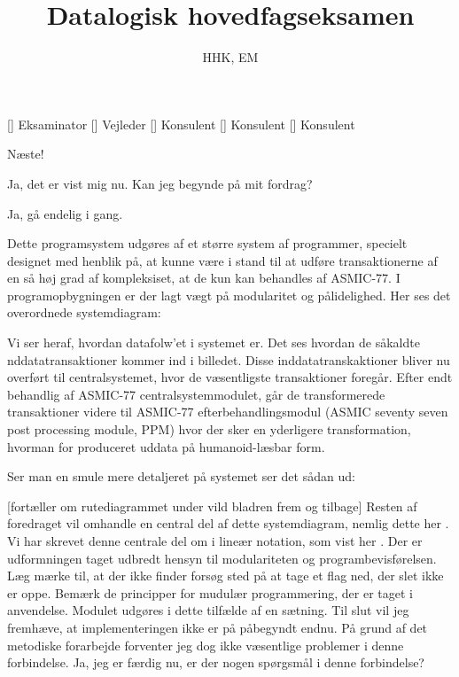 \documentclass[a4paper,11pt]{article}
\title{Datalogisk hovedfagseksamen}
\author{HHK, EM}
\begin{document}
\maketitle

\begin{roles}
[] Eksaminator
[] Vejleder
[] Konsulent
[] Konsulent
[] Konsulent
\end{roles}


\begin{sketch}


 Næste!

  Ja, det er vist mig nu. Kan jeg begynde
på mit fordrag?

 Ja, gå endelig i gang.

  Dette programsystem udgøres af et
større system af programmer, specielt designet med henblik på, at kunne være i
stand til at udføre transaktionerne af en så høj grad af kompleksiset, at de kun
kan behandles af ASMIC-77. I programopbygningen er der lagt vægt på modularitet
og pålidelighed. Her ses det overordnede systemdiagram: 

 Vi ser heraf, hvordan datafolw'et i systemet er. Det ses hvordan de
såkaldte nddatatransaktioner kommer ind i billedet. Disse inddatatranskaktioner
bliver nu overført til centralsystemet, hvor de væsentligste transaktioner
foregår. Efter endt behandlig af ASMIC-77 centralsystemmodulet, går de
transformerede transaktioner videre til ASMIC-77 efterbehandlingsmodul (ASMIC
seventy seven post processing module, PPM) hvor der sker en yderligere
transformation, hvorman for produceret uddata på humanoid-læsbar form.

Ser man en smule mere detaljeret på systemet ser det sådan ud: 

[fortæller om rutediagrammet under vild bladren frem og tilbage] Resten
af foredraget vil omhandle en central del af dette systemdiagram, nemlig dette
her . Vi har skrevet denne centrale del om i lineær notation, som
vist her . Der er udformningen taget
udbredt hensyn til modulariteten og programbevisførelsen. Læg mærke til, at der
ikke finder forsøg sted på at tage et flag ned, der slet ikke er oppe.
Bemærk de principper for mudulær programmering, der er taget i
anvendelse. Modulet udgøres i dette tilfælde af en sætning. Til slut vil jeg
fremhæve, at implementeringen ikke er på påbegyndt endnu. På grund af det
metodiske forarbejde forventer jeg dog ikke væsentlige problemer i denne
forbindelse. Ja, jeg er færdig nu, er der nogen spørgsmål i denne forbindelse?


\end{sketch}
\end{document}
